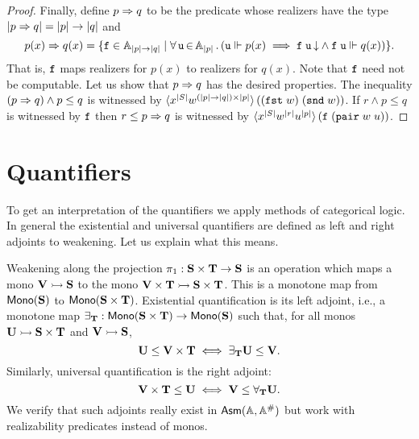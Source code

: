\begin{proof}
  Finally, define $p \Rightarrow q$ to be the predicate whose realizers have
  the type $|p \Rightarrow q| = |p| \to |q|$ and
  \begin{equation*}
    p(x) \Rightarrow q(x) = \{
      \mathtt{f} \in \mathbb{A}_{|p| \to |q|} \mid
      \forall\, \mathtt{u} \,{\in}\, \mathbb{A}_{|p|}\,.\left(
        \mathtt{u} \Vdash p(x)
        \implies
        \mathtt{f}\;\mathtt{u}\,{\downarrow} \land
        \mathtt{f}\;\mathtt{u} \Vdash q(x)
      \right)
    \}.
  \end{equation*}
  That is, $\mathtt{f}$ maps realizers for $p(x)$ to realizers for $q(x)$.
  Note that $\mathtt{f}$ need not be computable. Let us show that $p \Rightarrow
  q$ has the desired properties. The inequality $(p \Rightarrow q) \land p
  \leq q$ is witnessed by $\langle x^{|S|} w^{(|p| \to
      |q|) \times |p|} \rangle\,((\mathtt{fst}\;w)\; (\mathtt{snd}\;w))$. If $r \land p
  \leq q$ is witnessed by $\mathtt{f}$ then $r \leq p \Rightarrow q$ is witnessed
  by $\langle x^{|S|} w^{|r|}
    u^{|p|} \rangle\,(\mathtt{f}\;(\mathtt{pair}\;w\;u))$.
\end{proof}

\section{Quantifiers}
\label{sec:quantifiers}

To get an interpretation of the quantifiers we apply methods of
categorical logic. In general the existential and universal
quantifiers are defined as left and right adjoints to weakening. Let
us explain what this means.

Weakening along the projection $\pi_1 : \mathbf{S} \times \mathbf{T} \to
\mathbf{S}$ is an operation which maps a mono $\mathbf{V} \rightarrowtail \mathbf{S}$
to the mono $\mathbf{V} \times \mathbf{T} \rightarrowtail \mathbf{S} \times \mathbf{T}$.
This is a monotone map from $\mathsf{Mono}(\mathbf{S})$ to $\mathsf{Mono}(\mathbf{S} \times
  \mathbf{T})$. Existential quantification is its left adjoint, i.e., a
monotone map $\exists_{\mathbf{T}} : \mathsf{Mono}(\mathbf{S} \times \mathbf{T}) \to
\mathsf{Mono}(\mathbf{S})$ such that, for all monos $\mathbf{U} \rightarrowtail \mathbf{S}
\times \mathbf{T}$ and $\mathbf{V} \rightarrowtail \mathbf{S}$,
%
\begin{equation*}
  \mathbf{U} \leq \mathbf{V} \times \mathbf{T}
  \iff
  \exists_{\mathbf{T}} \mathbf{U} \leq \mathbf{V}.
\end{equation*}
%
Similarly, universal quantification is the right adjoint:
%
\begin{equation*}
  \mathbf{V} \times \mathbf{T} \leq \mathbf{U}
  \iff
  \mathbf{V} \leq \forall_{\mathbf{T}} \mathbf{U}.
\end{equation*}
%
We verify that such adjoints really exist in $\mathsf{Asm}(\mathbb{A},\mathbb{A}^{\#})$ but work with
realizability predicates instead of monos.

